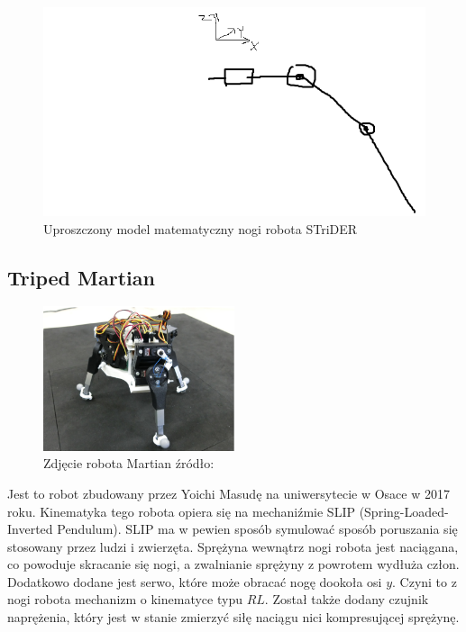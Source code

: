 \begin{figure}[h!]
\centering
\includegraphics[width=\textwidth]{img/strider_math.png}
\caption{Uproszczony model matematyczny nogi robota STriDER}
\label{strider_math}
\end{figure}

\subsection{Triped Martian}
\begin{figure}[h!]
\centering
\includegraphics[width=0.5\textwidth]{img/martian_photo.png}
\caption{Zdjęcie robota Martian źródło: \cite{Triped_Martian}}
\label{martian_photo}
\end{figure}
Jest to robot zbudowany przez Yoichi Masudę na uniwersytecie w Osace w 2017 roku. Kinematyka tego robota opiera się na mechaniźmie SLIP (Spring-Loaded-Inverted Pendulum). SLIP ma w pewien sposób symulować sposób poruszania się stosowany przez ludzi i zwierzęta. Sprężyna wewnątrz nogi robota jest naciągana, co powoduje skracanie się nogi, a zwalnianie sprężyny z powrotem wydłuża człon. Dodatkowo dodane jest serwo, które może obracać nogę dookoła osi $y$. Czyni to z nogi robota mechanizm o kinematyce typu $RL$. Został także dodany czujnik naprężenia, który jest w stanie zmierzyć siłę naciągu nici kompresującej sprężynę. \cite{Triped_Martian}\\

